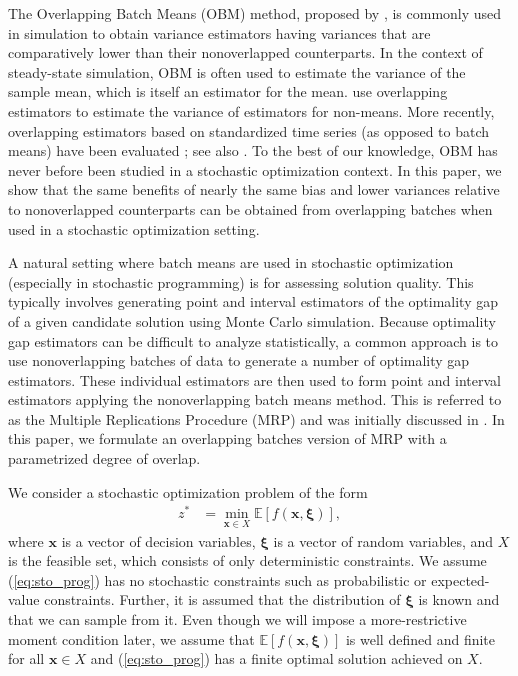\documentclass[12pt]{article}
\newcommand{\e}[1]{\mathbb{E} \left[ #1 \right]
}
\newcommand{\x}{\mathbf{x}}
\newcommand{\xit}{\boldsymbol{\xi}}
\begin{document}
The Overlapping Batch Means (OBM) method, proposed by \citet{Meketon1984}, is commonly used in simulation to obtain variance estimators having variances that are comparatively lower than their nonoverlapped counterparts. 
In the context of steady-state simulation, OBM is often used to estimate the variance of the sample mean, which is itself an estimator for the mean. 
\cite{SAH90} use overlapping estimators to estimate the variance of estimators for non-means. 
More recently, overlapping estimators based on standardized time series (as opposed to batch means) have been evaluated \citep{Alexopoulos01012007,Alexopoulos2007}; see also \citep{Meterelliyoz_etal_12}.
To the best of our knowledge, OBM has never before been studied in a stochastic optimization context. 
In this paper, we show that the same benefits of nearly the same bias and lower variances relative to nonoverlapped counterparts can be obtained from overlapping batches when used in a stochastic optimization setting.
  
A natural setting where batch means are used in stochastic optimization (especially in stochastic programming) is for assessing solution quality. 
This typically involves generating point and interval estimators of the optimality gap of a given candidate solution using Monte Carlo simulation. 
Because optimality gap estimators can be difficult to analyze statistically, a common approach is to use nonoverlapping batches of data to generate a number of optimality gap estimators. 
These individual estimators are then used to form point and interval estimators applying the nonoverlapping batch means method.
This is referred to as the Multiple Replications Procedure (MRP) and was initially discussed in \citep{Mak1999}.   
In this paper, we formulate an overlapping batches version of MRP with a parametrized degree of overlap.

We consider a stochastic optimization problem of the form 
\begin{align} \tag{SP} \label{eq:sto_prog} 
	z^* & = \min_{\x \in X} \e{f(\x,\xit)},
\end{align}
where $\x$ is a vector of decision variables, $\xit$ is a vector of random variables, and $X$ is the feasible set, which consists of only deterministic constraints. 
We assume (\ref{eq:sto_prog}) has no stochastic constraints such as probabilistic or expected-value constraints. 
Further, it is assumed that the distribution of $\xit$ is known and that we can sample from it.
Even though we will impose a more-restrictive moment condition later, we assume that $\e{f(\x,\xit)}$ is well defined and finite for all $\x \in X$ and (\ref{eq:sto_prog}) has a finite optimal solution achieved on $X$.
\end{document}
